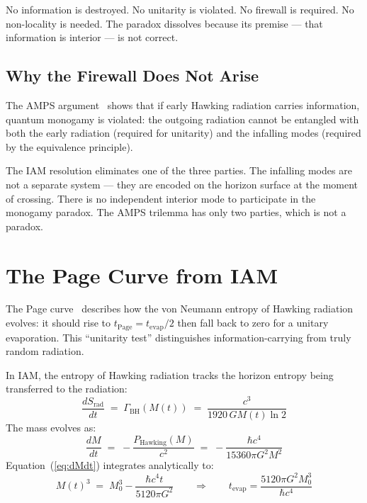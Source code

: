 \documentclass[12pt,letterpaper]{article}
\begin{document}
No information is destroyed. No unitarity is violated.
No firewall is required. No non-locality is needed.
The paradox dissolves because its premise --- that information
is interior --- is not correct.

\subsection{Why the Firewall Does Not Arise}

The AMPS argument~\cite{AMPS2012} shows that if early Hawking
radiation carries information, quantum monogamy is violated:
the outgoing radiation cannot be entangled with both the early
radiation (required for unitarity) and the infalling modes
(required by the equivalence principle).

The IAM resolution eliminates one of the three parties.
The infalling modes are not a separate system --- they are encoded
on the horizon surface at the moment of crossing.
There is no independent interior mode to participate in the
monogamy paradox. The AMPS trilemma has only two parties,
which is not a paradox.

\section{The Page Curve from IAM}

The Page curve~\cite{Page1993} describes how the von Neumann entropy
of Hawking radiation evolves: it should rise to $t_\text{Page} = t_\text{evap}/2$
then fall back to zero for a unitary evaporation.
This ``unitarity test'' distinguishes information-carrying from
truly random radiation.

In IAM, the entropy of Hawking radiation tracks the horizon
entropy being transferred to the radiation:
\begin{equation}
\frac{dS_\text{rad}}{dt} \;=\; \Gamma_\text{BH}(M(t))
\;=\; \frac{c^3}{1920\,G M(t)\ln 2}
\label{eq:dSdt}
\end{equation}
The mass evolves as:
\begin{equation}
\frac{dM}{dt} \;=\; -\frac{P_\text{Hawking}(M)}{c^2}
\;=\; -\frac{\hbar c^4}{15360\pi G^2 M^2}
\label{eq:dMdt}
\end{equation}
Equation~(\ref{eq:dMdt}) integrates analytically to:
\begin{equation}
M(t)^3 \;=\; M_0^3 - \frac{\hbar c^4 t}{5120\pi G^2}
\qquad\Longrightarrow\qquad
t_\text{evap} = \frac{5120\pi G^2 M_0^3}{\hbar c^4}
\label{eq:Mt}
\end{equation}
\end{document}
